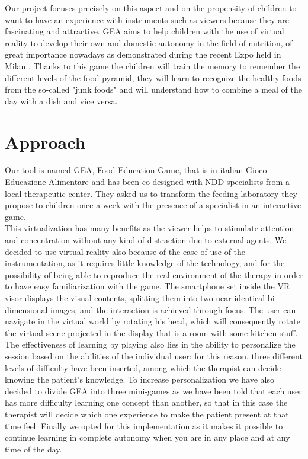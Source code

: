 \documentclass{sigchi-ext}
\begin{document}
\medskip
  Our project focuses precisely on this aspect and on the propensity of children to want to have an experience with instruments such as viewers because they are fascinating and attractive. GEA aims to help children with the use of virtual reality to develop their own and domestic autonomy in the field of nutrition, of great importance nowadays as demonstrated during the recent Expo held in Milan \cite{rif11}. Thanks to this game the children will train the memory to remember the different levels of the food pyramid, they will learn to recognize the healthy foods from the so-called "junk foods" and will understand how to combine a meal of the day with a dish and vice versa.


    
\section{Approach}
Our tool is named GEA, Food Education Game, that is in italian Gioco Educazione Alimentare and has been co-designed with NDD specialists from a local therapeutic center. They asked us to transform the feeding laboratory they propose to children once a week with the presence of a specialist in an interactive game.\\
\medskip
 This virtualization has many benefits as the viewer helps to stimulate attention and concentration without any kind of distraction due to external agents. We decided to use virtual reality also because of the ease of use of the instrumentation, as it requires little knowledge of the technology, and for the possibility of being able to reproduce the real environment of the therapy in order to have easy familiarization with the game. The smartphone set inside the VR visor displays the visual contents, splitting them into two near-identical bi-dimensional images, and the interaction is achieved through focus. The user can navigate in the virtual world by rotating his head, which will consequently rotate the virtual scene projected in the display that is a room with some kitchen stuff.\\
\medskip
  The effectiveness of learning by playing also lies in the ability to personalize the session based on the abilities of the individual user: for this reason, three different levels of difficulty have been inserted, among which the therapist can decide knowing the patient's knowledge. To increase personalization we have also decided to divide GEA into three mini-games as we have been told that each user has more difficulty learning one concept than another, so that in this case the therapist will decide which one experience to make the patient present at that time feel. Finally we opted for this implementation as it makes it possible to continue learning in complete autonomy when you are in any place and at any time of the day.
\end{document}

